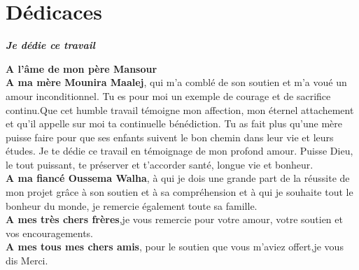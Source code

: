 \section*{Dédicaces}
\vspace{1.0in}
\begin{center}
\textit{\textbf{ Je dédie ce travail} }
\end{center}
\begin{center}
 \textbf{A l'âme de mon père Mansour}
 \\[0.2in]
 \textbf{A ma mère Mounira Maalej}, qui m'a comblé de son soutien et m'a 
voué un amour inconditionnel. Tu es pour moi un exemple de
courage et de sacrifice continu.Que cet humble travail témoigne
mon affection, mon éternel attachement et qu'il appelle sur moi
ta continuelle bénédiction. Tu as fait plus qu’une mère puisse faire pour que ses 
enfants suivent le bon chemin dans leur vie et leurs études. 
Je te dédie ce travail en témoignage de mon profond 
amour. Puisse Dieu, le tout puissant, te préserver et 
t’accorder santé, longue vie et bonheur.
\\[0.2in]
\textbf{A ma fiancé Oussema Walha},
à qui je dois une grande part de la réussite de mon projet grâce à
son soutien et à sa compréhension et à qui je souhaite tout le bonheur du monde,
je remercie également toute sa famille.
\\[0.2in]
\textbf{A mes très chers frères},je vous remercie pour votre amour, 
votre soutien et vos encouragements. 
\\[0.2in]
\textbf{A mes tous mes chers amis}, pour le soutien que vous m'aviez
offert,je vous dis Merci.
\end{center}


